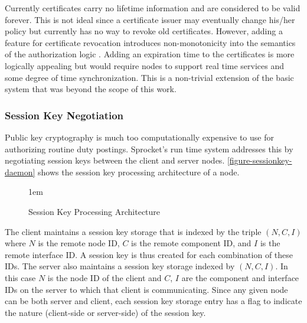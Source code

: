 Currently certificates carry no lifetime information and are considered to be valid forever.
This is not ideal since a certificate issuer may eventually change his/her policy but currently
has no way to revoke old certificates. However, adding a feature for certificate revocation
introduces non-monotonicity into the semantics of the authorization logic
\cite{Li01nonmonotonicity,Rivest:1998:WEC:647502.728327}. Adding an expiration time to the
certificates is more logically appealing but would require nodes to support real time services
and some degree of time synchronization. This is a non-trivial extension of the basic system
that was beyond the scope of this work.

\subsubsection{Session Key Negotiation}
\label{section-session-key-negotiation}

Public key cryptography is much too computationally expensive to use for authorizing routine
duty postings. Sprocket's run time system addresses this by negotiating session keys between the
client and server nodes. \autoref{figure-sessionkey-daemon} shows the session key processing
architecture of a node.

\begin{figure}[htbp]
  
  \centerline{\raise 1em\box\graph}
  \caption{Session Key Processing Architecture}
  \label{figure-sessionkey-daemon}
\end{figure}

The client maintains a session key storage that is indexed by the triple $(N, C, I)$ where $N$
is the remote node ID, $C$ is the remote component ID, and $I$ is the remote interface ID. A
session key is thus created for each combination of these IDs. The server also maintains a
session key storage indexed by $(N, C, I)$. In this case $N$ is the node ID of the client and
$C$, $I$ are the component and interface IDs on the server to which that client is
communicating. Since any given node can be both server and client, each session key storage
entry has a flag to indicate the nature (client-side or server-side) of the session key.

%

